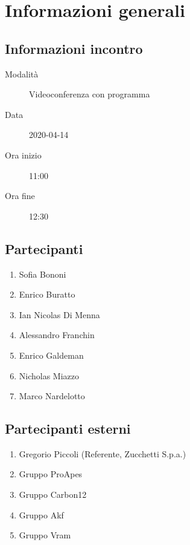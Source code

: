\documentclass{article}
\begin{document}


\section{Informazioni generali}%
\label{sec:informazioni_generali}

\subsection{Informazioni incontro}%
\label{sub:informazioni_incontro}

\begin{description}
  \item[Modalità] Videoconferenza con programma 
  \item[Data] 2020-04-14
  \item[Ora inizio] 11:00
  \item[Ora fine] 12:30
\end{description}

\subsection{Partecipanti}%
\label{sub:partecipanti}

\begin{enumerate}
  \item Sofia Bononi
  \item Enrico Buratto
  \item Ian Nicolas Di Menna
  \item Alessandro Franchin
  \item Enrico Galdeman
  \item Nicholas Miazzo
  \item Marco Nardelotto
\end{enumerate}

\subsection{Partecipanti esterni}%
\label{sub:partecipanti esterni}

\begin{enumerate}
    \item Gregorio Piccoli (Referente, Zucchetti S.p.a.)
    \item Gruppo ProApes
    \item Gruppo Carbon12
    \item Gruppo Akf
    \item Gruppo Vram
\end{enumerate}
\end{document}
